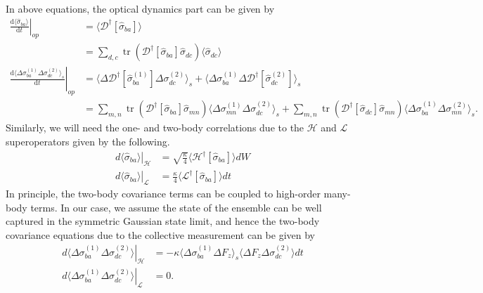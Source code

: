 \documentclass[preprint,aps,pra,onecolumn,superscriptaddress]{revtex4-1} %
\DeclareMathOperator{\tr}{tr}
\newcommand{\dt}[1]{\frac{{\mathrm d} {#1}}{{\mathrm d}t}}
\newcommand{\expect}[1]{\big\langle #1 \big\rangle}
\begin{document}
In above equations, the optical dynamics part can be given by
\begin{align}
\left. \dt{\expect{\hat{\sigma}_{ba}}}\right|_{op} &= \expect{\mathcal{D}^\dagger \left[ \hat{\sigma}_{ba}\right]}\\
&= \sum_{d,c}\tr\left(\mathcal{D}^\dagger \left[ \hat{\sigma}_{ba}\right]\hat{\sigma}_{dc} \right)\expect{\hat{\sigma}_{dc} }\\
\left. \dt{\expect{\Delta \sigma_{ba}^{(1)}\Delta \sigma_{dc}^{(2)}}_s}\right|_{op} &=\expect{\Delta\mathcal{D}^\dagger[\hat{\sigma}_{ba}^{(1)}]\Delta\sigma_{dc}^{(2)} }_s + \expect{\Delta\sigma_{ba}^{(1)}\Delta\mathcal{D}^\dagger[\hat{\sigma}_{dc}^{(2)}] }_s\\
&= \sum_{m,n}\tr\left(\mathcal{D}^\dagger[\hat{\sigma}_{ba}]\hat{\sigma}_{mn} \right)\expect{\Delta \sigma_{mn}^{(1)}\Delta \sigma_{dc}^{(2)} }_s + \sum_{m,n}\tr\left(\mathcal{D}^\dagger[\hat{\sigma}_{dc}]\hat{\sigma}_{mn} \right) \expect{\Delta \sigma_{ba}^{(1)}\Delta \sigma_{mn}^{(2)} }_s.
\end{align} 
Similarly, we will need the one- and two-body correlations due to the $ \mathcal{H} $ and $ \mathcal{L} $ superoperators given by the following.
\begin{subequations}
\begin{align}
\left.d\expect{\hat{\sigma}_{ba}}\right|_\mathcal{H} &=\sqrt{\frac{\kappa}{4}}\expect{\mathcal{H}^\dagger\left[\hat{\sigma}_{ba} \right]}dW \\
\left.d\expect{\hat{\sigma}_{ba}}\right|_\mathcal{L} &= \frac{\kappa}{4}\expect{\mathcal{L}^\dagger\left[\hat{\sigma}_{ba} \right]}dt
\end{align}
\end{subequations}
In principle, the two-body covariance terms can be coupled to high-order many-body terms. 
In our case, we assume the state of the ensemble can be well captured in the symmetric Gaussian state limit, and hence the two-body covariance equations due to the collective measurement can be given by
\begin{subequations}
\begin{align}
\left.d\expect{\Delta \sigma_{ba}^{(1)} \Delta \sigma_{dc}^{(2)}} \right|_\mathcal{H} &= -\kappa\expect{\Delta\sigma_{ba}^{(1)}\Delta F_z }_s \expect{\Delta F_z \Delta \sigma_{dc}^{(2)} }dt \\
\left.d\expect{\Delta \sigma_{ba}^{(1)} \Delta \sigma_{dc}^{(2)}}\right|_\mathcal{L} &= 0.
\end{align}
\end{subequations}
\end{document}
